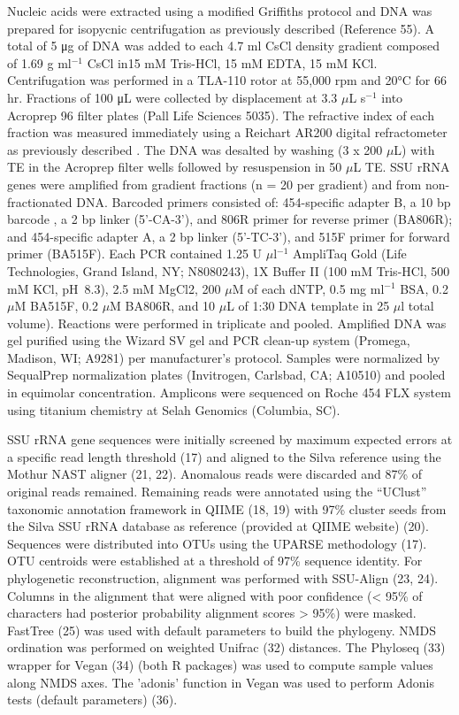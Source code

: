 Nucleic acids were extracted using a modified Griffiths protocol \cite{Griffiths_2000}
and DNA was prepared for isopycnic centrifugation as previously described
(Reference 55). A total of 5 μg of DNA was added to each 4.7 ml CsCl density
gradient composed of 1.69 g ml$^{-1}$ CsCl in15 mM Tris-HCl, 15 mM EDTA, 15 mM KCl.
Centrifugation was performed in a TLA-110 rotor at 55,000 rpm and 20°C for 66
hr. Fractions of 100 μL were collected by displacement at 3.3 $\mu$L s$^{-1}$
\cite{Manefield_2002} into Acroprep 96 filter plates (Pall Life Sciences 5035).
The refractive index of each fraction was measured immediately using a Reichart
AR200 digital refractometer as previously described
\cite{Buckley_2007}. The DNA was desalted by washing (3 x 200
$\mu$L) with TE in the Acroprep filter wells followed by resuspension in 50
$\mu$L TE. SSU rRNA genes were amplified from gradient fractions (n = 20 per
gradient) and from non-fractionated DNA. Barcoded primers consisted of:
454-specific adapter B, a 10 bp barcode \citep{Hamady_2008},
a 2 bp linker (5’-CA-3’), and 806R primer for reverse primer (BA806R); and
454-specific adapter A, a 2 bp linker (5’-TC-3’), and 515F primer for forward
primer (BA515F). Each PCR contained 1.25 U $\mu$l$^{-1}$ AmpliTaq Gold (Life
Technologies, Grand Island, NY; N8080243), 1X Buffer II (100 mM Tris-HCl, 500
mM KCl, pH~8.3), 2.5 mM MgCl2, 200 $\mu$M of each dNTP, 0.5 mg ml$^{-1}$ BSA,
0.2 $\mu$M BA515F, 0.2 $\mu$M BA806R, and 10 $\mu$L of 1:30 DNA template in 25
$\mu$l total volume). Reactions were performed in triplicate and pooled.
Amplified DNA was gel purified using the Wizard SV gel and PCR clean-up
system (Promega, Madison, WI; A9281) per manufacturer’s protocol. Samples
were normalized by SequalPrep normalization plates (Invitrogen, Carlsbad, CA;
A10510) and pooled in equimolar concentration. Amplicons were sequenced on
Roche 454 FLX system using titanium chemistry at Selah Genomics (Columbia,
SC). 

SSU rRNA gene sequences were initially screened by maximum expected
errors at a specific read length threshold (17) and aligned to the Silva
reference using the Mothur NAST aligner \citep{}(21, 22). Anomalous reads were
discarded and 87\% of original reads remained. Remaining reads were annotated
using the “UClust” taxonomic annotation framework in QIIME (18, 19) with 97\%
cluster seeds from the Silva SSU rRNA database as reference (provided at QIIME
website) (20). Sequences were distributed into OTUs using the UPARSE
methodology (17). OTU centroids were established at a threshold of 97\%
sequence identity. For phylogenetic reconstruction, alignment was performed
with SSU-Align (23, 24). Columns in the alignment that were aligned with poor
confidence (< 95\% of characters had posterior probability alignment scores
> 95\%) were masked. FastTree (25) was used with default parameters to build
the phylogeny. NMDS ordination was performed on weighted Unifrac (32)
distances. The Phyloseq (33) wrapper for Vegan (34) (both R packages) was used
to compute sample values along NMDS axes. The 'adonis' function in Vegan was
used to perform Adonis tests (default parameters) (36). 

